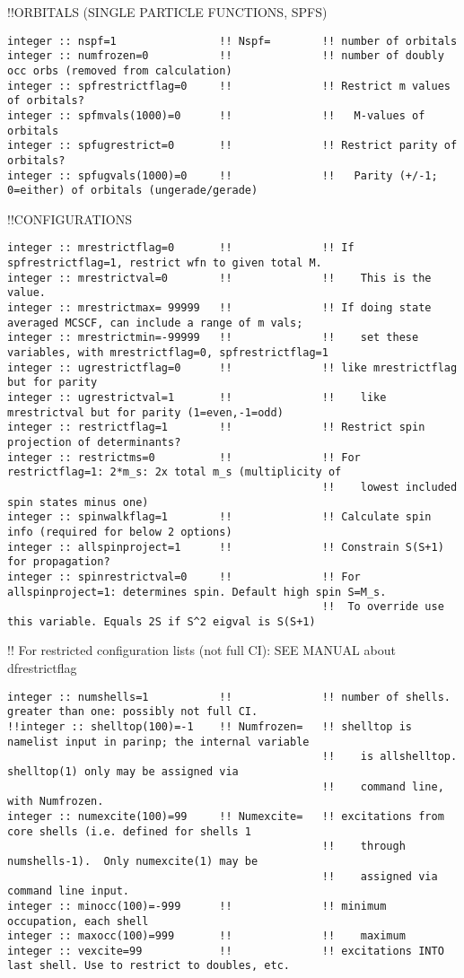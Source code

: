 !!{\large \quad ORBITALS (SINGLE PARTICLE FUNCTIONS, SPFS)}
\begin{verbatim}
integer :: nspf=1                !! Nspf=        !! number of orbitals
integer :: numfrozen=0           !!              !! number of doubly occ orbs (removed from calculation)
integer :: spfrestrictflag=0     !!              !! Restrict m values of orbitals?  
integer :: spfmvals(1000)=0      !!              !!   M-values of orbitals 
integer :: spfugrestrict=0       !!              !! Restrict parity of orbitals? 
integer :: spfugvals(1000)=0     !!              !!   Parity (+/-1; 0=either) of orbitals (ungerade/gerade)
\end{verbatim}
!!{\large \quad CONFIGURATIONS}
\begin{verbatim}
integer :: mrestrictflag=0       !!              !! If spfrestrictflag=1, restrict wfn to given total M.
integer :: mrestrictval=0        !!              !!    This is the value.
integer :: mrestrictmax= 99999   !!              !! If doing state averaged MCSCF, can include a range of m vals;
integer :: mrestrictmin=-99999   !!              !!    set these variables, with mrestrictflag=0, spfrestrictflag=1
integer :: ugrestrictflag=0      !!              !! like mrestrictflag but for parity
integer :: ugrestrictval=1       !!              !!    like mrestrictval but for parity (1=even,-1=odd)
integer :: restrictflag=1        !!              !! Restrict spin projection of determinants?
integer :: restrictms=0          !!              !! For restrictflag=1: 2*m_s: 2x total m_s (multiplicity of 
                                                 !!    lowest included spin states minus one)
integer :: spinwalkflag=1        !!              !! Calculate spin info (required for below 2 options)
integer :: allspinproject=1      !!              !! Constrain S(S+1) for propagation?
integer :: spinrestrictval=0     !!              !! For allspinproject=1: determines spin. Default high spin S=M_s.
                                                 !!  To override use this variable. Equals 2S if S^2 eigval is S(S+1)
\end{verbatim}
!! {\large \quad For restricted configuration lists (not full CI): SEE MANUAL about dfrestrictflag}
\begin{verbatim}
integer :: numshells=1           !!              !! number of shells.  greater than one: possibly not full CI. 
!!integer :: shelltop(100)=-1    !! Numfrozen=   !! shelltop is namelist input in parinp; the internal variable 
                                                 !!    is allshelltop.   shelltop(1) only may be assigned via 
                                                 !!    command line, with Numfrozen.
integer :: numexcite(100)=99     !! Numexcite=   !! excitations from core shells (i.e. defined for shells 1 
                                                 !!    through numshells-1).  Only numexcite(1) may be 
                                                 !!    assigned via command line input.
integer :: minocc(100)=-999      !!              !! minimum occupation, each shell
integer :: maxocc(100)=999       !!              !!    maximum
integer :: vexcite=99            !!              !! excitations INTO last shell. Use to restrict to doubles, etc.
\end{verbatim}
